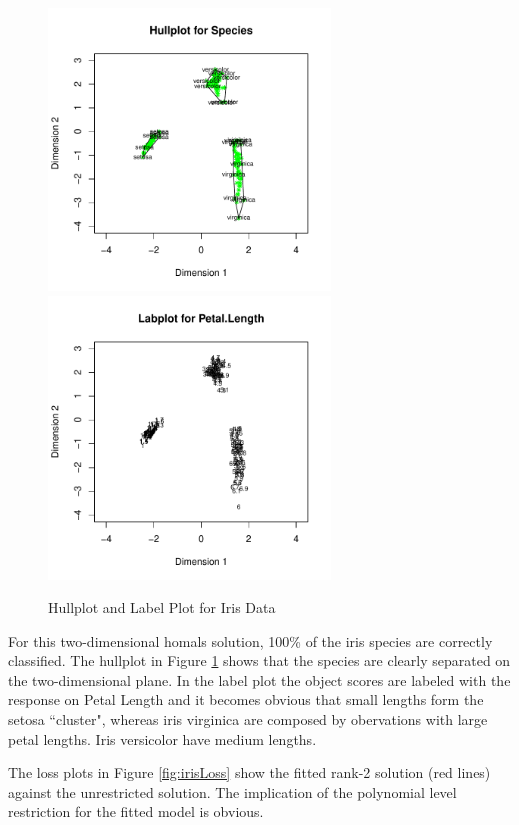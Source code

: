 \documentclass[article, nojss]{jss}
\begin{document}
\begin{figure}[hbt]
\begin{center}
\includegraphics[height=75mm, width=75mm]{irisHull.pdf}
\includegraphics[height=75mm, width=75mm]{irisLab.pdf}
\caption{\label{fig:iris}Hullplot and Label Plot for Iris Data}
\end{center}
\end{figure}

For this two-dimensional homals solution, 100\% of the iris species are correctly classified. The hullplot in Figure \ref{fig:iris} shows that the species are clearly separated on the two-dimensional plane. In the label plot the object scores are labeled with the response on Petal Length and it becomes obvious that small lengths form the setosa ``cluster", whereas iris virginica are composed by obervations with large petal lengths. Iris versicolor have medium lengths. 

The loss plots in Figure \ref{fig:irisLoss} show the fitted rank-2 solution (red lines) against the unrestricted solution. The implication of the polynomial level restriction for the fitted model is obvious.
\end{document}
